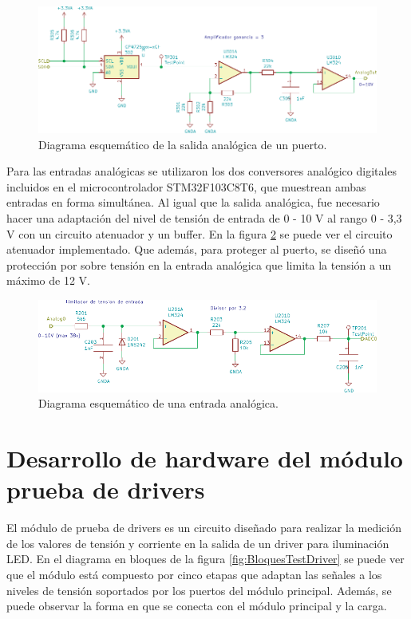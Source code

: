 \begin{figure}[H]
	\centering
	\includegraphics[width=1\textwidth]{./Figures/SalidaAnalogica.pdf}
	\caption{Diagrama esquemático de la salida analógica de un puerto.}
	\label{fig:SalidaAnalogica}
\end{figure}

Para las entradas analógicas se utilizaron los dos conversores analógico digitales incluidos en el microcontrolador STM32F103C8T6, que muestrean ambas entradas en forma simultánea. Al igual que la salida analógica, fue necesario hacer una adaptación del nivel de tensión de entrada de 0 - 10 V al rango 0 - 3,3 V con un circuito atenuador y un buffer. En la figura \ref{fig:EntradaAnalogica} se puede ver el circuito atenuador implementado. Que además, para proteger al puerto, se diseñó una protección por sobre tensión en la entrada analógica que limita la tensión a un máximo de 12 V.

\begin{figure}[H]
	\centering
	\includegraphics[width=1\textwidth]{./Figures/EntradaAnalogica.pdf}
	\caption{Diagrama esquemático de una entrada analógica.}
	\label{fig:EntradaAnalogica}
\end{figure}




\section{Desarrollo de hardware del módulo prueba de drivers}

El módulo de prueba de drivers es un circuito diseñado para realizar la medición de los valores de tensión y corriente en la salida de un driver para iluminación LED. En el diagrama en bloques de la figura \ref{fig:BloquesTestDriver} se puede ver que el módulo está compuesto por cinco etapas que adaptan las señales a los niveles de tensión soportados por los puertos del módulo principal. Además, se puede observar la forma en que se conecta con el módulo principal y la carga.

